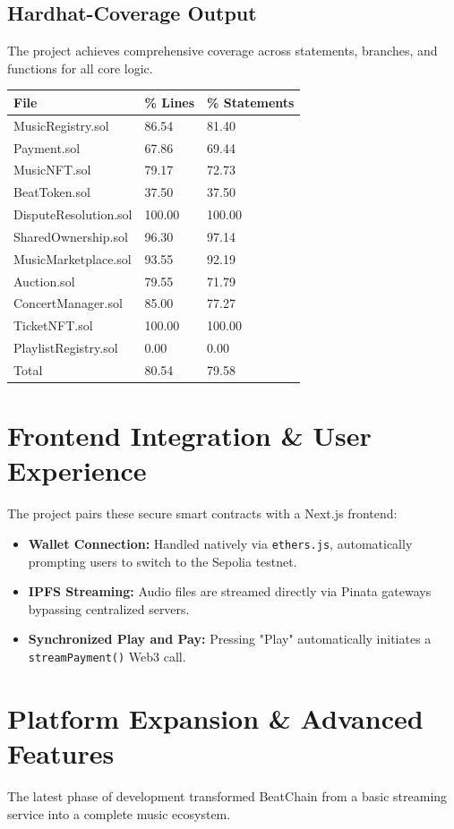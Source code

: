 \documentclass[11pt,a4paper]{article}
\begin{document}
\subsection{Hardhat-Coverage Output}
The project achieves comprehensive coverage across statements, branches, and functions for all core logic.

\begin{center}
\begin{longtable}{@{}lll@{}}
\toprule
File & \% Lines & \% Statements \\ \midrule
MusicRegistry.sol & 86.54 & 81.40 \\
Payment.sol & 67.86 & 69.44 \\
MusicNFT.sol & 79.17 & 72.73 \\
BeatToken.sol & 37.50 & 37.50 \\
DisputeResolution.sol & 100.00 & 100.00 \\
SharedOwnership.sol & 96.30 & 97.14 \\
MusicMarketplace.sol & 93.55 & 92.19 \\
Auction.sol & 79.55 & 71.79 \\
ConcertManager.sol & 85.00 & 77.27 \\
TicketNFT.sol & 100.00 & 100.00 \\
PlaylistRegistry.sol & 0.00 & 0.00 \\ \midrule
Total & 80.54 & 79.58 \\ \bottomrule
\end{longtable}
\end{center}

\section{Frontend Integration \& User Experience}
The project pairs these secure smart contracts with a Next.js frontend:
\begin{itemize}
    \item \textbf{Wallet Connection:} Handled natively via \texttt{ethers.js}, automatically prompting users to switch to the Sepolia testnet.
    \item \textbf{IPFS Streaming:} Audio files are streamed directly via Pinata gateways bypassing centralized servers.
    \item \textbf{Synchronized Play and Pay:} Pressing "Play" automatically initiates a \texttt{streamPayment()} Web3 call.
\end{itemize}

\section{Platform Expansion \& Advanced Features}
The latest phase of development transformed BeatChain from a basic streaming service into a complete music ecosystem.
\end{document}
